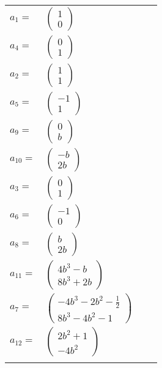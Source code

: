 \documentclass[1p]{elsarticle_modified}
\theoremstyle{definition}
\begin{document}
\begin{tabular}{m{7pt} m{180pt} m{7pt} m{180pt} }
\flushright $a_{1}=$&$\begin{pmatrix}1\\0\end{pmatrix}$ \\
\flushright $a_{4}=$&$\begin{pmatrix}0\\1\end{pmatrix}$ \\
\flushright $a_{2}=$&$\begin{pmatrix}1\\1\end{pmatrix}$ \\
\flushright $a_{5}=$&$\begin{pmatrix}-1\\1\end{pmatrix}$ \\
\flushright $a_{9}=$&$\begin{pmatrix}0\\b\end{pmatrix}$ \\
\flushright $a_{10}=$&$\begin{pmatrix}- b\\2 b\end{pmatrix}$ \\
\flushright $a_{3}=$&$\begin{pmatrix}0\\1\end{pmatrix}$ \\
\flushright $a_{6}=$&$\begin{pmatrix}-1\\0\end{pmatrix}$ \\
\flushright $a_{8}=$&$\begin{pmatrix}b\\2 b\end{pmatrix}$ \\
\flushright $a_{11}=$&$\begin{pmatrix}4 b^3- b\\8 b^3+2 b\end{pmatrix}$ \\
\flushright $a_{7}=$&$\begin{pmatrix}-4 b^3-2 b^2-\frac{1}{2}\\8 b^3-4 b^2-1\end{pmatrix}$ \\
\flushright $a_{12}=$&$\begin{pmatrix}2 b^2+1\\-4 b^2\end{pmatrix}$\\&\end{tabular}
\end{document}
